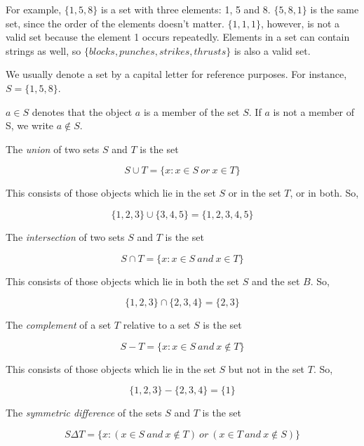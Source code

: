 \documentclass[10pt,twocolumn,a4paper]{article}
\begin{document}
  For example, $\{1,5,8\}$ is a set with three elements: 1, 5 and 8.
  $\{5,8,1\}$ is the same set, since the order of the elements doesn't matter.
  $\{1,1,1\}$, however, is not a valid set because the element 1 occurs
  repeatedly. Elements in a set can contain strings as well, so $\{blocks,
  punches, strikes, thrusts\}$ is also a valid set.

  We usually denote a set by a capital letter for reference purposes. For
  instance, $S=\{1,5,8\}$.

  $a \in S$ denotes that the object $a$ is a member of the set $S$. If $a$
  is not a member of S, we write $a \not \in S$.

  The \emph{union} of two sets $S$ and $T$ is the set

  \[
    S \cup T = \{x:x \in S \: or \: x \in T\}
  \]

  

  This consists of those objects which lie in the set $S$ or in the set $T$,
  or in both. So,

  \[
    \{1, 2, 3\} \cup \{3, 4, 5\} = \{1, 2, 3, 4, 5\}
  \]

  The \emph{intersection} of two sets $S$ and $T$ is the set

  \[
    S \cap T = \{x:x \in S \: and \: x \in T\}
  \]

  

  This consists of those objects which lie in both the set $S$ and the set
  $B$. So,

  \[
    \{1, 2, 3\} \cap \{2, 3, 4\} = \{2, 3\}
  \]

  The \emph{complement} of a set $T$ relative to a set $S$ is the set

  \[
    S - T = \{x:x \in S \: and \: x \not \in T\}
  \]

  

  This consists of those objects which lie in the set $S$ but not in the set
  $T$. So,

  \[
    \{1, 2, 3\} - \{2, 3, 4\} = \{1\}
  \]

  The \emph{symmetric difference} of the sets $S$ and $T$ is the set

  \[
    S \Delta T = \{x:(x \in S \: and \: x \not \in T) \: or \: (x \in T \: and
    \: x \not \in S)\}
  \]
\end{document}
